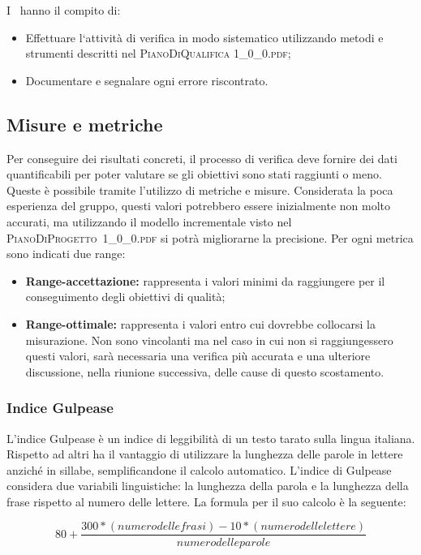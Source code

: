 		I \textit{\Vers}\ hanno il compito di:
		\begin{itemize}
			\item Effettuare l‘attività di verifica in modo sistematico utilizzando metodi e strumenti descritti nel \textsc{PianoDiQualifica 1\_0\_0.pdf};
			\item Documentare e segnalare ogni errore riscontrato.
		\end{itemize}	
		
	\subsection{Misure e metriche}
	Per conseguire dei risultati concreti, il processo di verifica deve fornire dei dati quantificabili per poter valutare se gli obiettivi sono stati raggiunti o meno. Queste è possibile tramite l’utilizzo di metriche e misure. Considerata la poca esperienza del gruppo, questi valori potrebbero essere inizialmente non molto accurati, ma utilizzando il modello incrementale visto nel \hbox{\textsc{PianoDiProgetto 1\_0\_0.pdf}} si potrà migliorarne la precisione.
	Per ogni metrica sono indicati due range:
	\begin{itemize}
		\item \textbf{Range-accettazione: }rappresenta i valori minimi da raggiungere per il conseguimento degli obiettivi di qualità;
		\item \textbf{Range-ottimale: }rappresenta i valori entro cui dovrebbe collocarsi la misurazione. Non sono vincolanti ma nel caso in cui non si raggiungessero questi valori, sarà necessaria una verifica più accurata e una ulteriore discussione, nella riunione successiva, delle cause di questo scostamento.
	\end{itemize}
	
	\subsubsection{Indice Gulpease}
	L'indice Gulpease è un indice di leggibilità di un testo tarato sulla lingua italiana. Rispetto ad altri ha il vantaggio di utilizzare la lunghezza delle parole in lettere anziché in sillabe, semplificandone il calcolo automatico.
	L'indice di Gulpease considera due variabili linguistiche: la lunghezza della parola e la lunghezza della frase rispetto al numero delle lettere.
	La formula per il suo calcolo è la seguente:
	
	\[ 80+\frac{300*(numero delle frasi)-10*(numero delle lettere)}{numero delle parole} \]
	
